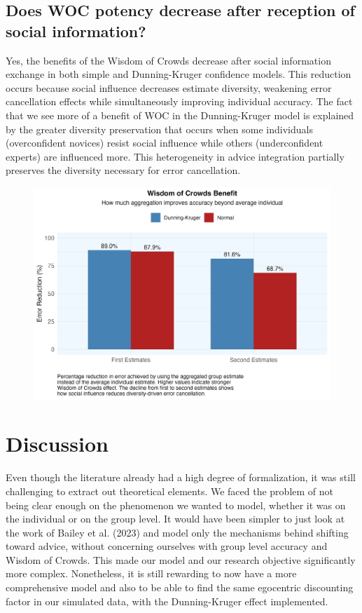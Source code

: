 \documentclass[
  man,floatsintext]{apa6}
\begin{document}
\hypertarget{does-woc-potency-decrease-after-reception-of-social-information}{%
\subsection{Does WOC potency decrease after reception of social information?}\label{does-woc-potency-decrease-after-reception-of-social-information}}

Yes, the benefits of the Wisdom of Crowds decrease after social information exchange in both simple and Dunning-Kruger confidence models. This reduction occurs because social influence decreases estimate diversity, weakening error cancellation effects while simultaneously improving individual accuracy. The fact that we see more of a benefit of WOC in the Dunning-Kruger model is explained by the greater diversity preservation that occurs when some individuals (overconfident novices) resist social influence while others (underconfident experts) are influenced more. This heterogeneity in advice integration partially preserves the diversity necessary for error cancellation.

\begin{figure}[H]
\includegraphics[width=7in]{photos/woc_effect} \caption{ }\label{fig:unnamed-chunk-7}
\end{figure}

\hypertarget{discussion}{%
\section{Discussion}\label{discussion}}

Even though the literature already had a high degree of formalization, it was still challenging to extract out theoretical elements. We faced the problem of not being clear enough on the phenomenon we wanted to model, whether it was on the individual or on the group level. It would have been simpler to just look at the work of Bailey et al. (2023) and model only the mechanisms behind shifting toward advice, without concerning ourselves with group level accuracy and Wisdom of Crowds. This made our model and our research objective significantly more complex. Nonetheless, it is still rewarding to now have a more comprehensive model and also to be able to find the same egocentric discounting factor in our simulated data, with the Dunning-Kruger effect implemented.
\end{document}
